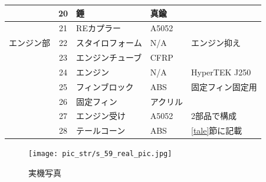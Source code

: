 \documentclass[a4paper,11pt,uplatex]{jsarticle}
\begin{document}
\begin{longtable}[H]{cclll}
	      & 20  & 錘         & 真鍮    &                                  \\\midrule
	      & 21  & REカプラー    & A5052 &                                  \\ \midrule
	エンジン部 & 22  & スタイロフォーム  & N/A   & エンジン抑え                           \\
	      & 23  & エンジンチューブ  & CFRP                                     \\
	      & 24  & エンジン      & N/A   & HyperTEK J250                    \\
	      & 25  & フィンブロック   & ABS   & 固定フィン固定用                         \\
	      & 26  & 固定フィン     & アクリル  &                                  \\
	      & 27  & エンジン受け    & A5052 & 2部品で構成                           \\
	      & 28  & テールコーン    & ABS   & \ref{tale}節に記載                   \\
	\bottomrule
\end{longtable}
\renewcommand{\arraystretch}{1.0}


\begin{figure}[H]
	\centering
	\texttt{[image: pic\_str/s\_59\_real\_pic.jpg]}
	\caption{実機写真}
	\label{s_real1}
\end{figure}
\end{document}
